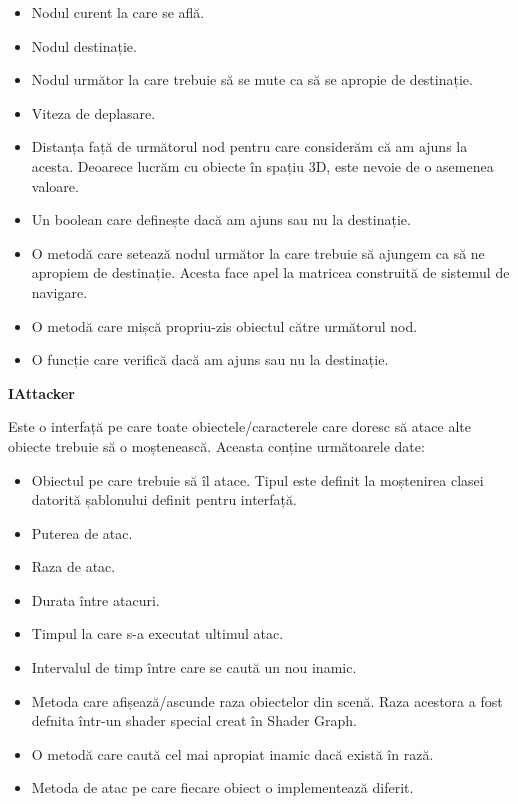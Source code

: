 \documentclass[12pt, a4paper]{article}
\begin{document}
	\begin{itemize}
		\item Nodul curent la care se află.
		\item Nodul destinație.
		\item Nodul următor la care trebuie să se mute ca să se apropie de destinație.
		\item Viteza de deplasare.
		\item Distanța față de următorul nod pentru care considerăm că am ajuns la acesta. Deoarece lucrăm cu obiecte în spațiu 3D, este nevoie de o asemenea valoare.
		\item Un boolean care definește dacă am ajuns sau nu la destinație.
		\item O metodă care setează nodul următor la care trebuie să ajungem ca să ne apropiem de destinație. Acesta face apel la matricea construită de sistemul de navigare.
		\item O metodă care mișcă propriu-zis obiectul către următorul nod.
		\item O funcție care verifică dacă am ajuns sau nu la destinație.
	\end{itemize}
	\bigskip
	
	
	\textbf{IAttacker}
	
	Este o interfață pe care toate obiectele/caracterele care doresc să atace alte obiecte trebuie să o moștenească. Aceasta conține următoarele date:
	
	\begin{itemize}
		\item Obiectul pe care trebuie să îl atace. Tipul este definit la moștenirea clasei datorită șablonului definit pentru interfață.
		\item Puterea de atac.
		\item Raza de atac.
		\item Durata între atacuri.
		\item Timpul la care s-a executat ultimul atac.
		\item Intervalul de timp între care se caută un nou inamic.
		\item Metoda care afișează/ascunde raza obiectelor din scenă. Raza acestora a fost defnita într-un shader special creat în Shader Graph.
		\item O metodă care caută cel mai apropiat inamic dacă există în rază.
		\item Metoda de atac pe care fiecare obiect o implementează diferit.
	\end{itemize}
	\bigskip
	
\end{document}
